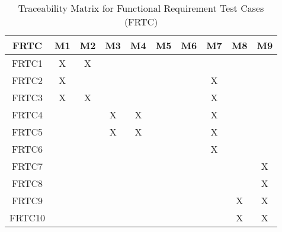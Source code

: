 \documentclass[12pt, titlepage]{article}
\begin{document}
\begin{table}[h!]
  \centering
  \caption{Traceability Matrix for Functional Requirement Test Cases (FRTC)}
  \begin{tabular}{|c|c|c|c|c|c|c|c|c|c|}
    \hline
    \textbf{FRTC} & \textbf{M1} & \textbf{M2} & \textbf{M3} & \textbf{M4} & \textbf{M5} & \textbf{M6} & \textbf{M7} & \textbf{M8} & \textbf{M9} \\
    \hline
    FRTC1 & X & X &   &   &   &   &   &   &   \\
    \hline
    FRTC2 & X &   &   &   &   &   & X &   &   \\
    \hline
    FRTC3 & X & X &   &   &   &   & X &   &   \\
    \hline
    FRTC4 &   &   & X & X &   &   & X &   &   \\
    \hline
    FRTC5 &   &   & X & X &   &   & X &   &   \\
    \hline
    FRTC6 &   &   &   &   &   &   & X &   &   \\
    \hline
    FRTC7 &   &   &   &   &   &   &   &   & X \\
    \hline
    FRTC8 &   &   &   &   &   &   &   &   & X \\
    \hline
    FRTC9 &   &   &   &   &   &   &   & X & X \\
    \hline
    FRTC10 &   &   &   &   &   &   &   & X & X \\
    \hline
  \end{tabular}
\end{table}
\end{document}
